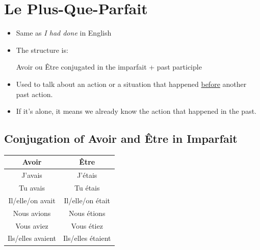 \documentclass{book}
\begin{document}
\chapter{Le Plus-Que-Parfait}
    \begin{itemize}
        \item Same as \textit{I had done} in English
        \item The structure is:
            \begin{center}
                Avoir ou Être conjugated in the imparfait + past participle
            \end{center}
        \item Used to talk about an action or a situation that happened \underline{before} another past action.
        \item If it's alone, it means we already know the action that happened in the past.
    \end{itemize}

    \section{Conjugation of Avoir and Être in Imparfait}
        \begin{center}
            \begin{tabular}{|c|c|}
                \hline
                \textbf{Avoir} & \textbf{Être} \\
                \hline
                J'avais & J'étais \\
                \hline
                Tu avais & Tu étais \\
                \hline
                Il/elle/on avait & Il/elle/on était \\
                \hline
                Nous avions & Nous étions \\
                \hline
                Vous aviez & Vous étiez \\
                \hline
                Ils/elles avaient & Ils/elles étaient \\
                \hline
            \end{tabular}
        \end{center}
    
\end{document}
